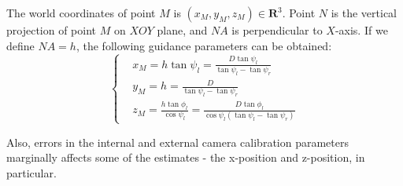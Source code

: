 The world coordinates of point ${M}$ is $(x_M, y_M, z_M)\in \textbf{R}^3 $. Point $N$ is the vertical projection of point $M$ on $XOY$ plane, and $NA$ is perpendicular to $X$-axis. If we define $NA = h$, the following guidance parameters can be obtained:
\begin{equation}
\left \{
\begin{aligned}
&x_M = h \tan \psi_l = \frac{D\tan \psi_l}{\tan \psi_l - \tan \psi_r}            \\
&y_M = h = \frac{D}{\tan \psi_l - \tan \psi_r} \\
&z_M = \frac{h\tan \phi_l}{\cos \psi_l} = \frac{D\tan \phi_l}{\cos \psi_l(\tan \psi_l - \tan \psi_r)}
\end{aligned} \right.
\label{eq:M_Positon_Equation}
\end{equation} 


Also, errors in the internal and external camera calibration parameters marginally affects some of the estimates - the x-position and z-position, in particular.

